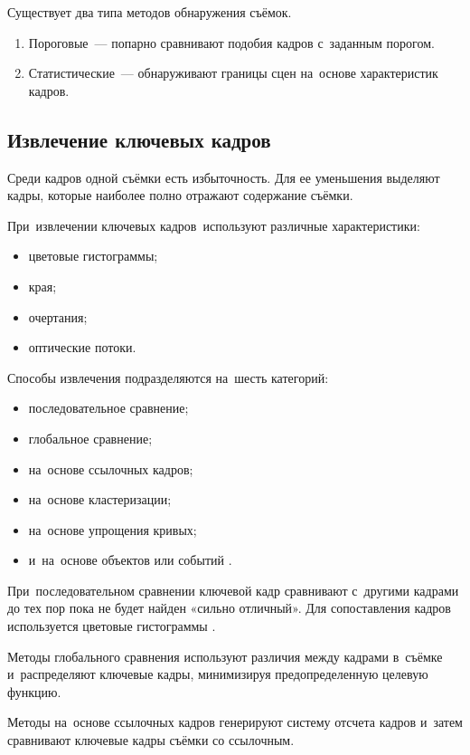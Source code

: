 Существует два типа методов обнаружения съёмок.
\begin{enumerate}
    \item Пороговые~— попарно сравнивают подобия кадров с~заданным порогом.
    \item Статистические~— обнаруживают границы сцен на~основе характеристик кадров.
\end{enumerate}

\subsection{Извлечение ключевых кадров}

Среди кадров одной съёмки есть избыточность.
Для ее уменьшения выделяют кадры,
которые наиболее полно отражают содержание съёмки.

При~извлечении ключевых кадров\
используют различные характеристики:
\begin{itemize}
    \item цветовые гистограммы;
    \item края;
    \item очертания;
    \item оптические потоки.
\end{itemize}

Способы извлечения подразделяются на~шесть категорий:
\begin{itemize}
    \item последовательное сравнение;
    \item глобальное сравнение;
    \item на~основе ссылочных кадров;
    \item на~основе кластеризации;
    \item на~основе упрощения кривых;
    \item и~на~основе объектов или событий \cite{Truong:2007}.
\end{itemize}

При~последовательном сравнении ключевой кадр сравнивают
с~другими кадрами до тех пор пока не будет найден «сильно отличный».
Для сопоставления кадров используется цветовые гистограммы \cite{Zhang:2003}.

Методы глобального сравнения используют различия между кадрами
в~съёмке и~распределяют ключевые кадры,
минимизируя предопределенную целевую функцию.

Методы на~основе ссылочных кадров генерируют систему отсчета кадров
и~затем сравнивают ключевые кадры съёмки со ссылочным.

